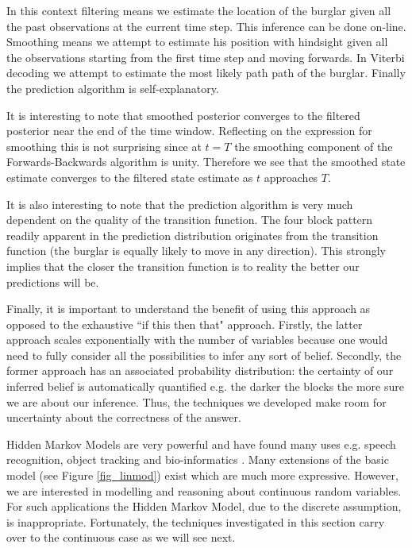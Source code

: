\documentclass[../masters.tex]{subfiles}
\begin{document}
In this context filtering means we estimate the location of the burglar given all the past observations at the current time step. This inference can be done on-line. Smoothing means we attempt to estimate his position with hindsight given all the observations starting from the first time step and moving forwards. In Viterbi decoding we attempt to estimate the most likely path path of the burglar. Finally the prediction algorithm is self-explanatory.

It is interesting to note that smoothed posterior converges to the filtered posterior near the end of the time window. Reflecting on the expression for smoothing this is not surprising since at $t=T$ the smoothing component of the Forwards-Backwards algorithm is unity. Therefore we see that the smoothed state estimate converges to the filtered state estimate as $t$ approaches $T$.

It is also interesting to note that the prediction algorithm is very much dependent on the quality of the transition function. The four block pattern readily apparent in the prediction distribution originates from the transition function (the burglar is equally likely to move in any direction). This strongly implies that the closer the transition function is to reality the better our predictions will be.

Finally, it is important to understand the benefit of using this approach as opposed to the exhaustive ``if this then that" approach. Firstly, the latter approach scales exponentially with the number of variables because one would need to fully consider all the possibilities to infer any sort of belief. Secondly, the former approach has an associated probability distribution: the certainty of our inferred belief is automatically quantified e.g. the darker the blocks the more sure we are about our inference. Thus, the techniques we developed make room for uncertainty about the correctness of the answer.

Hidden Markov Models are very powerful and have found many uses e.g. speech recognition, object tracking and bio-informatics \cite{barber}. Many extensions of the basic model (see Figure \ref{fig_linmod}) exist which are much more expressive. However, we are interested in modelling and reasoning about continuous random variables. For such applications the Hidden Markov Model, due to the discrete assumption, is inappropriate. Fortunately, the techniques investigated in this section carry over to the continuous case as we will see next.  

%
%
\end{document}
